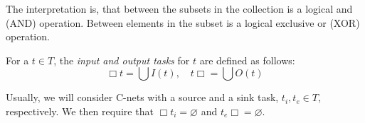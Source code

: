 \documentclass[12pt, a4paper]{article}
\numberwithin{equation}{section}
\begin{document}
The interpretation is, that between the subsets in the collection is a logical and (AND) operation. Between elements in the subset is a logical exclusive or (XOR) operation.

For a $t\in T$, the \textit{input and output tasks} for $t$ are defined as follows:
\begin{equation}
\Box t=\bigcup I(t),\quad t\Box=\bigcup O(t)
\end{equation}

Usually, we will consider C-nets with a source and a sink task, $t_i, t_e\in T$, respectively. We then require that $\Box t_i=\varnothing$ and $t_e\Box=\varnothing$.
\end{document}
